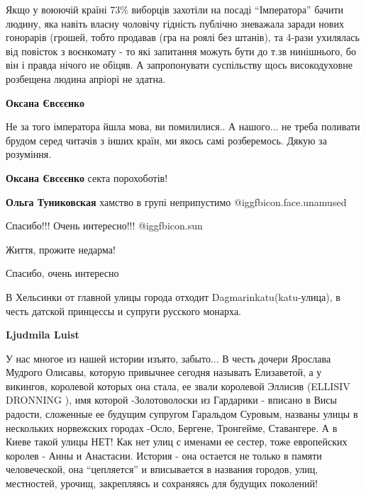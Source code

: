 \begin{itemize}
\begin{itemize}
Якщо у воюючій країні 73\% виборців захотіли на посаді \enquote{Імператора} бачити
людину, яка навіть власну чоловічу гідність публічно зневажала заради нових
гонорарів (грошей, тобто продавав (гра на роялі без штанів), та 4-рази
ухилялась від повісток з воєнкомату - то які запитання можуть бути до т.зв
нинішнього, бо він і правда нічого не обіцяв. А запропонувати суспільству щось
високодуховне розбещена людина апріорі не здатна.

\begin{itemize} %
\textbf{Оксана Євсєєнко} 

Не за того імператора йшла мова, ви помилилися.. А нашого... не треба поливати
брудом серед читачів з інших країн, ми якось самі розберемось. Дякую за
розуміння.

\textbf{Оксана Євсєєнко} секта порохоботів!

\textbf{Ольга Туниковская} хамство в групі неприпустимо  @igg{fbicon.face.unamused} 
\end{itemize} %

\end{itemize} %


Спасибо!!!
Очень интересно!!! @igg{fbicon.sun}

Життя, прожите недарма!

Спасибо, очень интересно


В Хельсинки от главной улицы города отходит Dagmarinkatu(katu-улица), в честь
датской принцессы и супруги русского монарха.

\begin{itemize} %
\textbf{Ljudmila Luist} 


У нас многое из нашей истории изъято, забыто... В честь дочери Ярослава Мудрого
Олисавы, которую привычнее сегодня называть Елизаветой, а у викингов, королевой
которых она стала, ее звали королевой Эллисив (ELLISIV DRONNING ), имя которой
-Золотоволоски из Гардарики - вписано в Висы радости, сложенные ее будущим
супругом Гаральдом Суровым, названы улицы в нескольких норвежских городах
-Осло, Бергене, Тронгейме, Ставангере. А в Киеве такой улицы НЕТ! Как нет улиц
с именами ее сестер, тоже европейских королев - Анны и Анастасии. История - она
остается не только в памяти человеческой, она \enquote{цепляется} и вписывается в
названия городов, улиц, местностей, урочищ, закрепляясь и сохраняясь для
будущих поколений!


\end{itemize}
\end{itemize}
